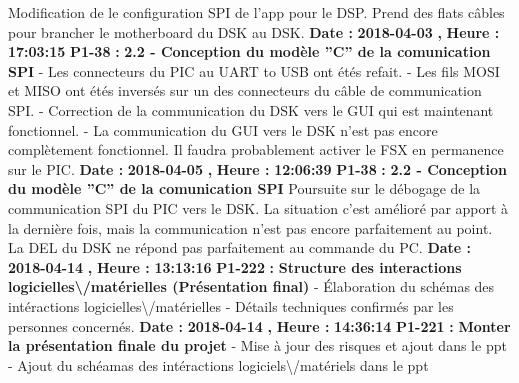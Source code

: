 \documentclass{article}%
\begin{document}
\newline%
\newline%
%
Modification de le configuration SPI de l'app pour le DSP. Prend des flats câbles pour brancher le motherboard du DSK au DSK. \newline%
\newline%
%
\textbf{Date : }%
\textbf{2018{-}04{-}03}%
\textbf{,}%
\textbf{ Heure : }%
\textbf{17:03:15}%
\newline%
%
\textbf{P1{-}38 }%
\textbf{ : }%
\textbf{ 2.2 {-} Conception du modèle ''C'' de la comunication SPI}%
\newline%
\newline%
%
{-} Les connecteurs du PIC au UART to USB ont étés refait.\newline%
{-} Les fils MOSI et MISO ont étés inversés sur un des connecteurs du câble de communication SPI.\newline%
{-} Correction de la communication du DSK vers le GUI qui est maintenant fonctionnel. \newline%
{-} La communication du GUI vers le DSK n'est pas encore complètement fonctionnel. Il faudra probablement activer le FSX en permanence sur le PIC. \newline%
\newline%
%
\textbf{Date : }%
\textbf{2018{-}04{-}05}%
\textbf{,}%
\textbf{ Heure : }%
\textbf{12:06:39}%
\newline%
%
\textbf{P1{-}38 }%
\textbf{ : }%
\textbf{ 2.2 {-} Conception du modèle ''C'' de la comunication SPI}%
\newline%
\newline%
%
Poursuite sur le débogage de la communication SPI du PIC vers le DSK. La situation c'est amélioré par apport à la dernière fois, mais la communication n'est pas encore parfaitement au point. La DEL du DSK ne répond pas parfaitement au commande du PC.\newline%
\newline%
%
\textbf{Date : }%
\textbf{2018{-}04{-}14}%
\textbf{,}%
\textbf{ Heure : }%
\textbf{13:13:16}%
\newline%
%
\textbf{P1{-}222 }%
\textbf{ : }%
\textbf{ Structure des interactions logicielles\textbackslash{}/matérielles (Présentation final)}%
\newline%
\newline%
%
{-} Élaboration du schémas des intéractions logicielles\textbackslash{}/matérielles \newline%
{-} Détails techniques confirmés par les personnes concernés.\newline%
\newline%
%
\textbf{Date : }%
\textbf{2018{-}04{-}14}%
\textbf{,}%
\textbf{ Heure : }%
\textbf{14:36:14}%
\newline%
%
\textbf{P1{-}221 }%
\textbf{ : }%
\textbf{ Monter la présentation finale du projet }%
\newline%
\newline%
%
{-} Mise à jour des risques et ajout dans le ppt\newline%
{-} Ajout du schéamas des intéractions logiciels\textbackslash{}/matériels dans le ppt\newline%
\newline%
%
\newpage
\end{document}
